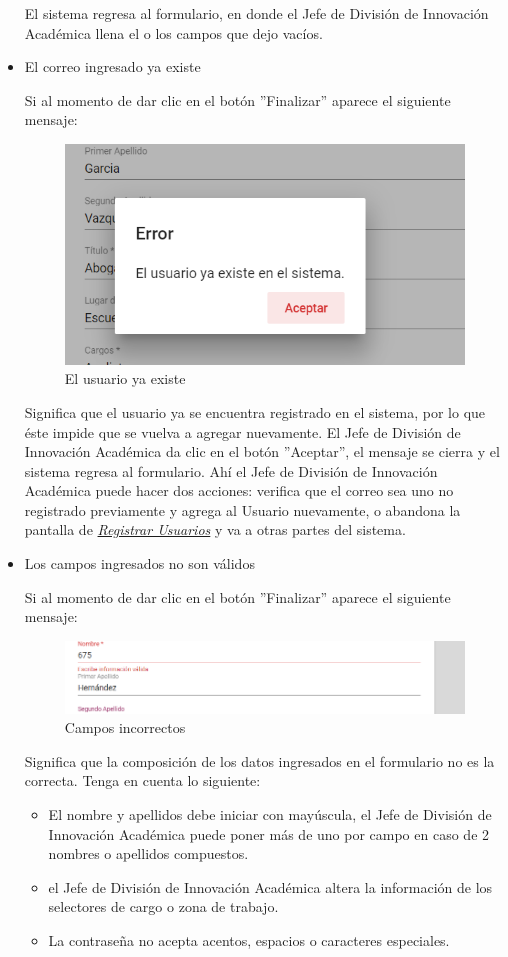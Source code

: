 \begin{itemize}
	El sistema regresa  al formulario, en donde el Jefe de División de Innovación Académica  llena el o los campos que dejo vacíos.
	\item El correo ingresado ya existe
	
	Si al momento de dar clic en el botón ''Finalizar'' aparece el siguiente mensaje:
	
	\begin{figure}[H]
		\centering
		\includegraphics[width=0.4\linewidth]{images/SP5/MSG36}
		\caption{El usuario ya existe}
		\label{mensaje36}
		
	\end{figure}
	
	Significa que el usuario ya se encuentra registrado en el sistema, por lo que éste impide que se vuelva a agregar nuevamente. El Jefe de División de Innovación Académica  da clic en el botón ''Aceptar'', el mensaje se cierra y el sistema regresa al formulario. Ahí el Jefe de División de Innovación Académica  puede hacer dos acciones: verifica que el correo sea uno no registrado previamente y agrega al Usuario nuevamente, o abandona la pantalla de \hyperlink{registrarUs}{\textit{Registrar Usuarios}} y va a otras partes del sistema.
	
	\item Los campos ingresados no son válidos
	
	Si al momento de dar clic en el botón ''Finalizar'' aparece el siguiente mensaje:
	
	\begin{figure}[H]
		\centering
		\includegraphics[width=0.4\linewidth]{images/SP5/MSG35}
		\caption{Campos incorrectos}
		\label{mensaje35}
		
	\end{figure}
	
	
	Significa que la composición de los datos ingresados en el formulario no es la correcta. Tenga en cuenta lo siguiente:
	
	\begin{itemize}
		\item El nombre y apellidos debe iniciar con mayúscula, el Jefe de División de Innovación Académica  puede poner más de uno por campo en caso de 2 nombres o apellidos compuestos.
		\item el Jefe de División de Innovación Académica  altera la información de los selectores de cargo o zona de trabajo.
		\item La contraseña no acepta acentos, espacios o caracteres especiales.
	\end{itemize}
\end{itemize}